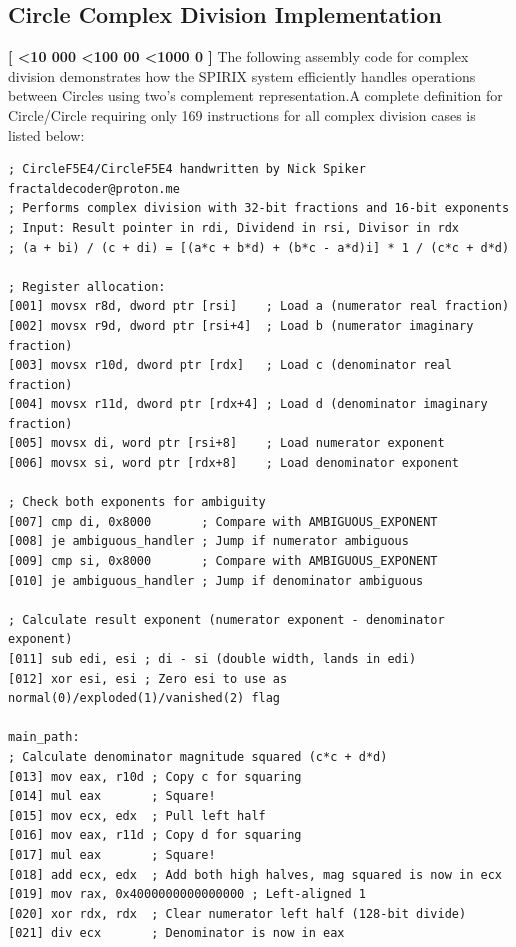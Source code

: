 \documentclass[12pt,letter]{article}
\newcounter{paracounter}
\newcommand{\ppara}[1]{
\noindent\textbf{[\formatparanumber{\arabic{paracounter}}]} \begingroup\RaggedRight\sloppy\hbadness=10000 #1\par\endgroup%
\stepcounter{paracounter}%
}
\newcommand{\formatparanumber}[1]{%
\ifnum#1<10 000%
\else\ifnum#1<100 00%
\else\ifnum#1<1000 0%
\fi\fi\fi#1%
}
\begin{document}
\subsection*{Circle Complex Division Implementation}

\ppara{The following assembly code for complex division demonstrates how the SPIRIX system efficiently handles operations between Circles using two's complement representation.\hspace{0.2cm}A complete definition for Circle/Circle requiring only 169 instructions for all complex division cases is listed below:}

\begin{lstlisting}[style=rust, caption={Full complex division assembly instructions including ambiguous handling}, label={fig:circle_divide}]
; CircleF5E4/CircleF5E4 handwritten by Nick Spiker fractaldecoder@proton.me
; Performs complex division with 32-bit fractions and 16-bit exponents
; Input: Result pointer in rdi, Dividend in rsi, Divisor in rdx
; (a + bi) / (c + di) = [(a*c + b*d) + (b*c - a*d)i] * 1 / (c*c + d*d)

; Register allocation:
[001] movsx r8d, dword ptr [rsi]    ; Load a (numerator real fraction)
[002] movsx r9d, dword ptr [rsi+4]  ; Load b (numerator imaginary fraction)
[003] movsx r10d, dword ptr [rdx]   ; Load c (denominator real fraction)
[004] movsx r11d, dword ptr [rdx+4] ; Load d (denominator imaginary fraction)
[005] movsx di, word ptr [rsi+8]    ; Load numerator exponent
[006] movsx si, word ptr [rdx+8]    ; Load denominator exponent

; Check both exponents for ambiguity
[007] cmp di, 0x8000       ; Compare with AMBIGUOUS_EXPONENT
[008] je ambiguous_handler ; Jump if numerator ambiguous
[009] cmp si, 0x8000       ; Compare with AMBIGUOUS_EXPONENT
[010] je ambiguous_handler ; Jump if denominator ambiguous

; Calculate result exponent (numerator exponent - denominator exponent)
[011] sub edi, esi ; di - si (double width, lands in edi)
[012] xor esi, esi ; Zero esi to use as normal(0)/exploded(1)/vanished(2) flag

main_path:
; Calculate denominator magnitude squared (c*c + d*d)
[013] mov eax, r10d ; Copy c for squaring
[014] mul eax       ; Square!
[015] mov ecx, edx  ; Pull left half
[016] mov eax, r11d ; Copy d for squaring
[017] mul eax       ; Square!
[018] add ecx, edx  ; Add both high halves, mag squared is now in ecx
[019] mov rax, 0x4000000000000000 ; Left-aligned 1
[020] xor rdx, rdx  ; Clear numerator left half (128-bit divide)
[021] div ecx       ; Denominator is now in eax


\end{lstlisting}
\end{document}

